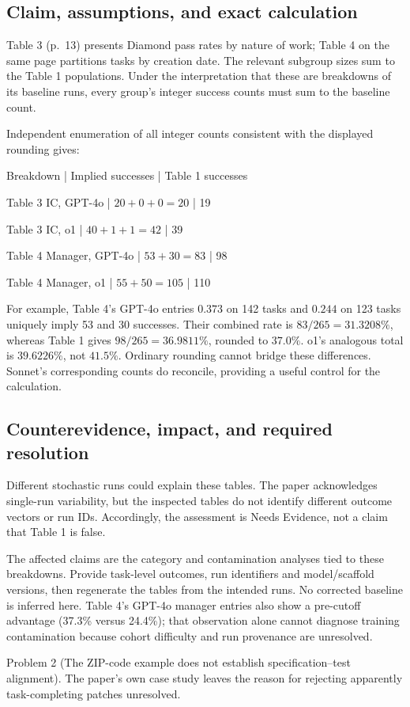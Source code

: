 \documentclass[10pt]{article}
\begin{document}
\subsection*{Claim, assumptions, and exact calculation}
Table 3 (p. 13) presents Diamond pass rates by nature of work; Table 4 on the same page partitions tasks by creation date. The relevant subgroup sizes sum to the Table 1 populations. Under the interpretation that these are breakdowns of its baseline runs, every group’s integer success counts must sum to the baseline count.\par
Independent enumeration of all integer counts consistent with the displayed rounding gives:\par
Breakdown | Implied successes | Table 1 successes\par
Table 3 IC, GPT-4o | \(20+0+0=20\) | 19\par
Table 3 IC, o1 | \(40+1+1=42\) | 39\par
Table 4 Manager, GPT-4o | \(53+30=83\) | 98\par
Table 4 Manager, o1 | \(55+50=105\) | 110\par
For example, Table 4’s GPT-4o entries \(0.373\) on 142 tasks and \(0.244\) on 123 tasks uniquely imply 53 and 30 successes. Their combined rate is \(83/265=31.3208\%\), whereas Table 1 gives \(98/265=36.9811\%\), rounded to \(37.0\%\). o1’s analogous total is \(39.6226\%\), not \(41.5\%\). Ordinary rounding cannot bridge these differences. Sonnet’s corresponding counts do reconcile, providing a useful control for the calculation.\par
\subsection*{Counterevidence, impact, and required resolution}
Different stochastic runs could explain these tables. The paper acknowledges single-run variability, but the inspected tables do not identify different outcome vectors or run IDs. Accordingly, the assessment is Needs Evidence, not a claim that Table 1 is false.\par
The affected claims are the category and contamination analyses tied to these breakdowns. Provide task-level outcomes, run identifiers and model/scaffold versions, then regenerate the tables from the intended runs. No corrected baseline is inferred here. Table 4’s GPT-4o manager entries also show a pre-cutoff advantage (37.3\% versus 24.4\%); that observation alone cannot diagnose training contamination because cohort difficulty and run provenance are unresolved.\par
Problem 2 (The ZIP-code example does not establish specification–test alignment).  The paper’s own case study leaves the reason for rejecting apparently task-completing patches unresolved.\par
\end{document}

